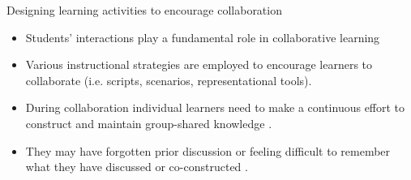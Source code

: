 \begin{frame}[allowframebreaks]{Designing learning activities to encourage collaboration}
    \begin{itemize}
        \item Students' interactions play a fundamental role in collaborative learning 
        \cite{Baines2009ImprovingStudy,Webb2009TheClassroom}
        \item Various instructional strategies are employed to encourage learners to collaborate 
        (i.e. scripts, scenarios, representational tools).
        \item During collaboration individual learners need to make a continuous effort 
        to construct and maintain group-shared knowledge \cite{Roschelle1995TheSolving}. 
        \item They may have forgotten prior discussion or feeling difficult to remember 
        what they have discussed or co-constructed \cite{Jeong2016SevenHelp}.
    \end{itemize}
\end{frame}

